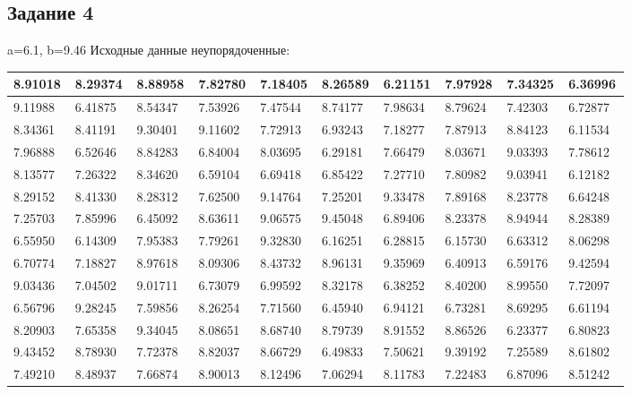 \subsection{Задание 4}%
\label{subsec:4}%
a=6.1, b=9.46\newline%
\newline%
%
Исходные данные неупорядоченные:\newline%
\newline%
%
\begin{changemargin}{-4cm}{0cm}\small{%
\begin{tabular}{|p{0.08\linewidth}|p{0.08\linewidth}|p{0.08\linewidth}|p{0.08\linewidth}|p{0.08\linewidth}|p{0.08\linewidth}|p{0.08\linewidth}|p{0.08\linewidth}|p{0.08\linewidth}|p{0.08\linewidth}|}%
\hline%
8.91018&8.29374&8.88958&7.82780&7.18405&8.26589&6.21151&7.97928&7.34325&6.36996\\%
\hline%
9.11988&6.41875&8.54347&7.53926&7.47544&8.74177&7.98634&8.79624&7.42303&6.72877\\%
\hline%
8.34361&8.41191&9.30401&9.11602&7.72913&6.93243&7.18277&7.87913&8.84123&6.11534\\%
\hline%
7.96888&6.52646&8.84283&6.84004&8.03695&6.29181&7.66479&8.03671&9.03393&7.78612\\%
\hline%
8.13577&7.26322&8.34620&6.59104&6.69418&6.85422&7.27710&7.80982&9.03941&6.12182\\%
\hline%
8.29152&8.41330&8.28312&7.62500&9.14764&7.25201&9.33478&7.89168&8.23778&6.64248\\%
\hline%
7.25703&7.85996&6.45092&8.63611&9.06575&9.45048&6.89406&8.23378&8.94944&8.28389\\%
\hline%
6.55950&6.14309&7.95383&7.79261&9.32830&6.16251&6.28815&6.15730&6.63312&8.06298\\%
\hline%
6.70774&7.18827&8.97618&8.09306&8.43732&8.96131&9.35969&6.40913&6.59176&9.42594\\%
\hline%
9.03436&7.04502&9.01711&6.73079&6.99592&8.32178&6.38252&8.40200&8.99550&7.72097\\%
\hline%
6.56796&9.28245&7.59856&8.26254&7.71560&6.45940&6.94121&6.73281&8.69295&6.61194\\%
\hline%
8.20903&7.65358&9.34045&8.08651&8.68740&8.79739&8.91552&8.86526&6.23377&6.80823\\%
\hline%
9.43452&8.78930&7.72378&8.82037&8.66729&6.49833&7.50621&9.39192&7.25589&8.61802\\%
\hline%
7.49210&8.48937&7.66874&8.90013&8.12496&7.06294&8.11783&7.22483&6.87096&8.51242\\%

\end{tabular}}
\end{changemargin}
